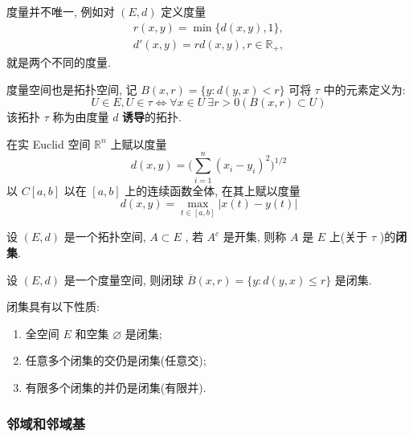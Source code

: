 \documentclass[lang=cn,10pt]{gorgeousnbook}
\numberwithin{equation}{section}%
\numberwithin{figure}{section}%
\begin{document}
\begin{remark}\label{rmk:度量不唯一}
   度量并不唯一, 例如对 $ (E, d) $ 定义度量
   \begin{equation*}
      \begin{aligned}
         r(x, y) = \min\{ d(x, y), 1 \}, \\
         d'(x, y) = rd(x, y), r\in\mathbb{R}_{+},
      \end{aligned}
   \end{equation*}
   就是两个不同的度量.
\end{remark}

度量空间也是拓扑空间, 记 $B(x, r)=\{y:d(y, x)<r\}$ 可将 $\tau$ 中的元素定义为:
\[U\in E, U\in \tau\Leftrightarrow \forall x\in U\ \exists r>0(B(x, r)\subset U)\]
该拓扑 $ \tau $ 称为由度量 $ d $ \textbf{诱导}的拓扑.

\begin{exercise}
   在实 Euclid 空间 $ \mathbb{R}^{n} $ 上赋以度量
   \begin{equation}
      d(x, y)=\bigg( \sum_{i=1}^{n}(x_{i}-y_{i})^{2} \bigg)^{1/2}\tag{Euclid距离}
   \end{equation}
以 $ C[a, b] $ 以在 $ [a, b] $ 上的连续函数全体, 在其上赋以度量
\begin{equation}
d(x, y) = \max_{t\in [a, b]} |x(t)-y(t)|\tag{一致距离}
\end{equation}
\end{exercise}

\begin{definition}[闭集]\label{def:闭集}
   设 $ (E, d) $ 是一个拓扑空间, $ A\subset E $ , 若 $ A^{c} $ 是开集, 则称 $ A $ 是 $ E $ 上(关于 $ \tau $ )的\textbf{闭集}.
\end{definition}
\begin{exercise}
   设 $ (E, d) $ 是一个度量空间, 则闭球 $ \overline{B}(x, r)=\{ y: d(y, x)\leqslant r \} $ 是闭集.
\end{exercise}
\begin{proposition}\label{prop:闭集的性质}
   闭集具有以下性质:
   \begin{enumerate}[(1)]
      \item 全空间 $ E $ 和空集 $ \varnothing $ 是闭集;
      \item 任意多个闭集的交仍是闭集(任意交);
      \item 有限多个闭集的并仍是闭集(有限并).
   \end{enumerate}
\end{proposition}

\subsubsection{邻域和邻域基}
\end{document}
